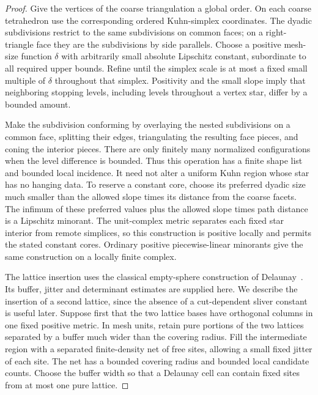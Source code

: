 \begin{proof}
Give the vertices of the coarse triangulation a global order.  On each
coarse tetrahedron use the corresponding ordered Kuhn-simplex
coordinates.  The dyadic subdivisions restrict to the same subdivisions
on common faces; on a right-triangle face they are the subdivisions by
side parallels.  Choose a positive mesh-size function $\delta$ with
arbitrarily small absolute Lipschitz constant, subordinate to all
required upper bounds.  Refine until the simplex scale is at most a
fixed small multiple of $\delta$ throughout that simplex.  Positivity
and the small slope imply that neighboring stopping levels, including
levels throughout a vertex star, differ by a bounded amount.

Make the subdivision conforming by overlaying the nested subdivisions
on a common face, splitting their edges, triangulating the resulting
face pieces, and coning the interior pieces.  There are only finitely
many normalized configurations when the level difference is bounded.
Thus this operation has a finite shape list and bounded local
incidence.  It need not alter a uniform Kuhn region whose star has no
hanging data.  To reserve a constant core, choose its preferred dyadic
size much smaller than the allowed slope times its distance from the
coarse facets.  The infimum of these preferred values plus the allowed
slope times path distance is a Lipschitz minorant.  The unit-complex
metric separates each fixed star interior from remote simplices, so
this construction is positive locally and permits the stated constant
cores.  Ordinary positive piecewise-linear minorants give the same
construction on a locally finite complex.

The lattice insertion uses the classical empty-sphere construction
of Delaunay~\cite{Delaunay1934}.  Its buffer, jitter and determinant
estimates are supplied here.  We describe the insertion of a second lattice,
since the absence of a
cut-dependent sliver constant is useful later.  Suppose first that the
two lattice bases have orthogonal columns in one fixed positive
metric.  In mesh units, retain pure portions of the two lattices
separated by a buffer much wider than the covering radius.  Fill the
intermediate region with a separated finite-density net of free sites,
allowing a small fixed jitter of each site.  The net has a bounded
covering radius and bounded local candidate counts.  Choose the
buffer width so that a Delaunay cell can contain fixed sites from at
most one pure lattice.


\end{proof}
